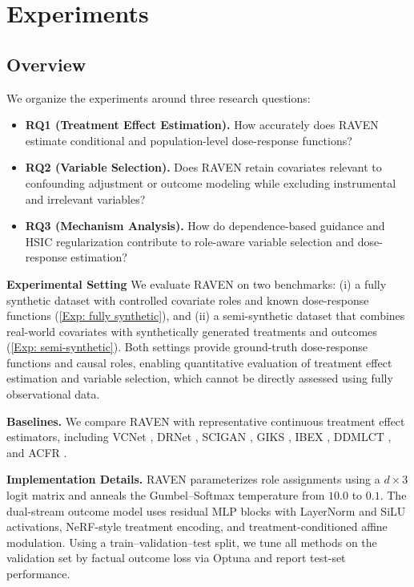\documentclass[twoside]{article}
\theoremstyle{plain}
\theoremstyle{definition}
\theoremstyle{remark}
\newtheorem{proof sketch}[theorem]{Proof Sketch}
\begin{document}
\section{Experiments}
\subsection{Overview}
We organize the experiments around three research questions:
\begin{itemize}[leftmargin=*, itemsep=1pt, topsep=2pt, parsep=0pt]
    \item \textbf{RQ1 (Treatment Effect Estimation).} How accurately does RAVEN estimate conditional and population-level dose-response functions?

    \item \textbf{RQ2 (Variable Selection).} Does RAVEN retain covariates relevant to confounding adjustment or outcome modeling while excluding instrumental and irrelevant variables? 

    \item \textbf{RQ3 (Mechanism Analysis).} How do dependence-based guidance and HSIC regularization contribute to role-aware variable selection and dose-response estimation? 
\end{itemize}

\textbf{Experimental Setting}
We evaluate RAVEN on two benchmarks:
(i) a fully synthetic dataset with controlled covariate roles and known dose-response functions (\cref{Exp: fully synthetic}), and 
(ii) a semi-synthetic dataset that combines real-world covariates with synthetically generated treatments and outcomes (\cref{Exp: semi-synthetic}).
Both settings provide ground-truth dose-response functions and causal roles, enabling quantitative evaluation of treatment effect estimation and variable selection, which cannot be directly assessed using fully observational data. 

\textbf{Baselines.}
We compare RAVEN with representative continuous treatment effect estimators, including VCNet \citep{nie2021vcnet}, DRNet \citep{schwab2020learning}, SCIGAN \citep{bica2020estimating}, GIKS \citep{nagalapatti2024continuous}, IBEX \citep{van2026continuous}, DDMLCT \citep{colangelo2025double}, and ACFR \citep{kazemi2024adversarially}.

\textbf{Implementation Details.}
RAVEN parameterizes role assignments using a \(d\times3\) logit matrix and anneals the Gumbel--Softmax temperature from \(10.0\) to \(0.1\).
The dual-stream outcome model uses residual MLP blocks with LayerNorm and SiLU activations, NeRF-style treatment encoding, and treatment-conditioned affine modulation.
Using a train--validation--test split, we tune all methods on the validation set by factual outcome loss via Optuna and report test-set performance.
\end{document}
